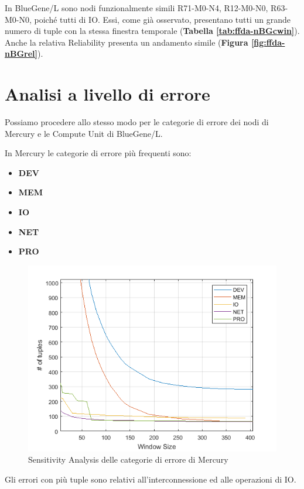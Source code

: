 			In BlueGene/L sono nodi funzionalmente simili R71-M0-N4, R12-M0-N0, R63-M0-N0, poiché tutti di IO. Essi, come già osservato, presentano tutti un grande numero di tuple con la stessa finestra temporale (\textbf{Tabella \ref{tab:ffda-nBGcwin}}). Anche la relativa Reliability presenta un andamento simile (\textbf{Figura \ref{fig:ffda-nBGrel}}).
	
	\section{Analisi a livello di errore}
		Possiamo procedere allo stesso modo per le categorie di errore dei nodi di Mercury e le Compute Unit di BlueGene/L.\par
		In Mercury le categorie di errore più frequenti sono:
		\begin{itemize}
			\item \textbf{DEV}
			\item \textbf{MEM}
			\item \textbf{IO}
			\item \textbf{NET}
			\item \textbf{PRO}
		\end{itemize}
		
		\begin{figure}[H]
			\centering
			\includegraphics[scale=0.7]{./immagine/categorieMcwin.png}
			\caption{Sensitivity Analysis delle categorie di errore di Mercury}
			\label{fig:ffda-cMcwin}
		\end{figure}
		Gli errori con più tuple sono relativi all'interconnessione ed alle operazioni di IO. 
	
